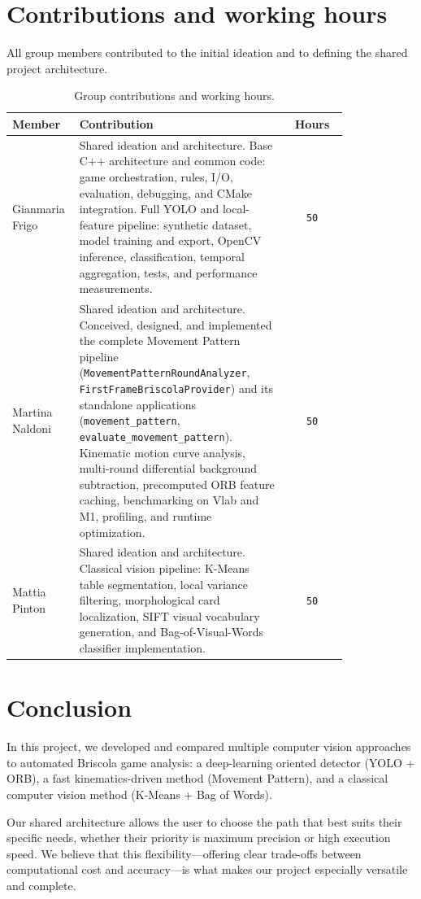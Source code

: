 \documentclass[11pt,a4paper]{article}
\begin{document}
\clearpage
\section{Contributions and working hours}

All group members contributed to the initial ideation and to defining the
shared project architecture.

\begin{table}[h]
    \centering
    \small
    \begin{tabular}{p{0.20\linewidth} >{\raggedright\arraybackslash}p{0.62\linewidth} c}
        \hline
        Member & Contribution & Hours \\
        \hline
        Gianmaria Frigo & Shared ideation and architecture. Base C++
        architecture and common code: game orchestration, rules, I/O,
        evaluation, debugging, and CMake integration. Full YOLO and
        local-feature pipeline: synthetic dataset, model training and export,
        OpenCV inference, classification, temporal aggregation, tests, and
        performance measurements. & \texttt{50} \\
        Martina Naldoni & Shared ideation and architecture. Conceived, designed,
        and implemented the complete Movement Pattern pipeline
        (\texttt{MovementPatternRoundAnalyzer}, \texttt{FirstFrameBriscolaProvider})
        and its standalone applications (\texttt{movement\_}\allowbreak\texttt{pattern},
        \texttt{evaluate\_}\allowbreak\texttt{movement\_}\allowbreak\texttt{pattern}). Kinematic motion curve analysis,
        multi-round differential background subtraction, precomputed ORB feature
        caching, benchmarking on Vlab and M1, profiling, and runtime optimization. &
        \texttt{50} \\
        Mattia Pinton & Shared ideation and architecture. Classical
        vision pipeline: K-Means table segmentation, local variance filtering,
        morphological card localization, SIFT visual vocabulary generation,
        and Bag-of-Visual-Words classifier implementation. &
        \texttt{50} \\
        \hline
    \end{tabular}
    \caption{Group contributions and working hours.}
    \label{tab:contributions}
\end{table}

\section{Conclusion}

In this project, we developed and compared multiple computer vision approaches
to automated Briscola game analysis: a deep-learning oriented detector (YOLO + ORB),
a fast kinematics-driven method (Movement Pattern), and a classical
computer vision method (K-Means + Bag of Words).

Our shared architecture allows the user to choose the path that best suits their
specific needs, whether their priority is maximum precision or high execution
speed.  We believe that this flexibility—offering clear
trade-offs between computational cost and accuracy—is what makes our project
especially versatile and complete.
\end{document}

